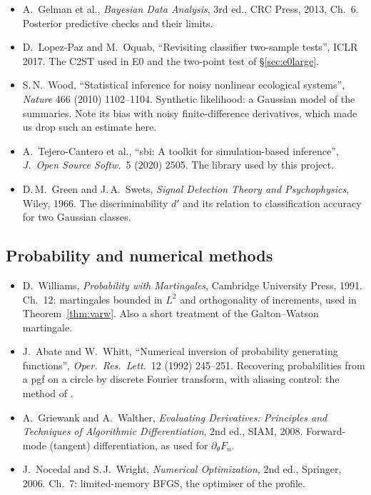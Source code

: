 \documentclass[11pt]{article}
\theoremstyle{definition}
\theoremstyle{remark}
\newcommand{\code}[1]{\texttt{\detokenize{#1}}}
\begin{document}
\begin{itemize}
\item[S10] A.\ Gelman et al., \emph{Bayesian Data Analysis}, 3rd ed., CRC Press, 2013, Ch.~6. Posterior predictive checks and their limits.
\item[S11] D.\ Lopez-Paz and M.\ Oquab, ``Revisiting classifier two-sample tests'', ICLR 2017. The C2ST used in E0 and the two-point test of \S\ref{sec:e0large}.
\item[S12] S.\,N.\ Wood, ``Statistical inference for noisy nonlinear ecological systems'', \emph{Nature} 466 (2010) 1102--1104. Synthetic likelihood: a Gaussian model of the summaries. Note its bias with noisy finite-difference derivatives, which made us drop such an estimate here.
\item[S13] A.\ Tejero-Cantero et al., ``sbi: A toolkit for simulation-based inference'', \emph{J.\ Open Source Softw.}\ 5 (2020) 2505. The library used by this project.
\item[S14] D.\,M.\ Green and J.\,A.\ Swets, \emph{Signal Detection Theory and Psychophysics}, Wiley, 1966. The discriminability $d'$ and its relation to classification accuracy for two Gaussian classes.
\end{itemize}

\subsection*{Probability and numerical methods}
\begin{itemize}
\item[P1] D.\ Williams, \emph{Probability with Martingales}, Cambridge University Press, 1991. Ch.~12: martingales bounded in $L^2$ and orthogonality of increments, used in Theorem~\ref{thm:varw}. Also a short treatment of the Galton--Watson martingale.
\item[N1] J.\ Abate and W.\ Whitt, ``Numerical inversion of probability generating functions'', \emph{Oper.\ Res.\ Lett.}\ 12 (1992) 245--251. Recovering probabilities from a pgf on a circle by discrete Fourier transform, with aliasing control: the method of \code{gwexact.py}.
\item[N2] A.\ Griewank and A.\ Walther, \emph{Evaluating Derivatives: Principles and Techniques of Algorithmic Differentiation}, 2nd ed., SIAM, 2008. Forward-mode (tangent) differentiation, as used for $\partial_\theta F_n$.
\item[N3] J.\ Nocedal and S.\,J.\ Wright, \emph{Numerical Optimization}, 2nd ed., Springer, 2006. Ch.~7: limited-memory BFGS, the optimiser of the profile.
\end{itemize}
\end{document}
